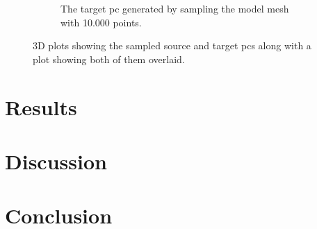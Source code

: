 \begin{figure}[!h]
\begin{subfigure}[b]{0.48\textwidth}
		\caption{The target \gls{pc} generated by sampling the model mesh with \num{10,000} points.}
		\label{fig:pe-feature-unfiltered-pc}
	\end{subfigure}
	\caption{3D plots showing the sampled source and target \gls{pc}s along with a plot showing both of them overlaid.}
	\label{fig:pe-filture-and-unfiltered-pc}
\end{figure}



\section{Results}\label{sec:2-pose-estimation-results}


\section{Discussion}\label{sec:2-pose-estimation-discussion}

\section{Conclusion}\label{sec:2-pose-estimation-conclusion}
